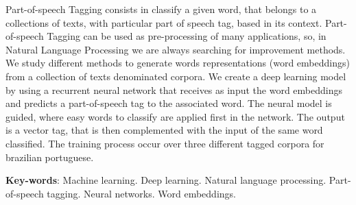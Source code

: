 \begin{resumo}[Abstract]
 
Part-of-speech Tagging consists in classify a given word, that belongs to a collections of texts, with particular part of speech tag, based in its context.  Part-of-speech Tagging can be used as pre-processing of many applications, so, in Natural Language Processing we are always searching for improvement methods. We study different methods to generate words representations (word embeddings) from a collection of texts denominated corpora. We create a deep learning model by using a recurrent neural network that receives as input the word embeddings and predicts a part-of-speech tag to the associated word. The neural model is guided, where easy words to classify are applied first in the network. The output is a vector tag, that is then complemented with the input of the same word classified. The training process occur over three different tagged corpora for brazilian portuguese.

 \vspace{\onelineskip}
 
 \noindent 
 \textbf{Key-words}: Machine learning. Deep learning. Natural language processing. Part-of-speech tagging. Neural networks. Word embeddings.
\end{resumo}
